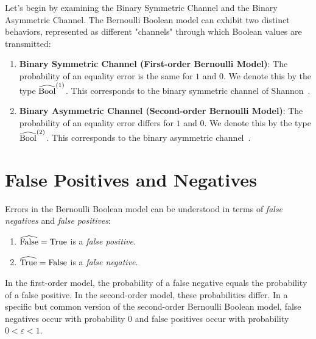 \documentclass[../main.tex]{subfiles}
\begin{document}
Let's begin by examining the Binary Symmetric Channel and the Binary Asymmetric Channel. The Bernoulli Boolean model can exhibit two distinct behaviors, represented as different "channels" through which Boolean values are transmitted:

\begin{enumerate}
\item \textbf{Binary Symmetric Channel (First-order Bernoulli Model)}: The probability of an equality error is the same for $1$ and $0$. We denote this by the type $\widehat{\mathrm{Bool}}^{(1)}$. This corresponds to the binary symmetric channel of Shannon~\cite{shannonBSC}.

\item \textbf{Binary Asymmetric Channel (Second-order Bernoulli Model)}: The probability of an equality error differs for $1$ and $0$. We denote this by the type $\widehat{\mathrm{Bool}}^{(2)}$. This corresponds to the binary asymmetric channel~\cite{coverThomas}.
\end{enumerate}

\section{False Positives and Negatives}

Errors in the Bernoulli Boolean model can be understood in terms of \emph{false negatives} and \emph{false positives}:

\begin{enumerate}
\item $\widehat{\mathrm{False}} = \mathrm{True}$ is a \emph{false positive}.
\item $\widehat{\mathrm{True}} = \mathrm{False}$ is a \emph{false negative}.
\end{enumerate}

In the first-order model, the probability of a false negative equals the probability of a false positive. In the second-order model, these probabilities differ. In a specific but common version of the second-order Bernoulli Boolean model, false negatives occur with probability 0 and false positives occur with probability $0 < \varepsilon < 1$.
\end{document}
